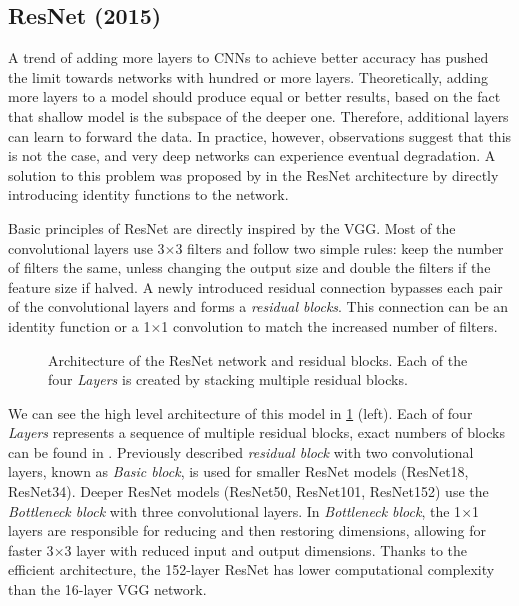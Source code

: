 \subsection{ResNet (2015)}
\label{sec:resnet}
A trend of adding more layers to CNNs to achieve better accuracy has pushed the limit towards networks with hundred or more layers.  Theoretically, adding more layers to a model should produce equal or better results, based on the fact that shallow model is the subspace of the deeper one. Therefore, additional layers can learn to forward the data. In practice, however, observations suggest that this is not the case, and very deep networks can experience eventual degradation. A solution to this problem was proposed by \citeauthor{bib:resnet} \cite{bib:resnet} in the ResNet architecture by directly introducing identity functions to the network.

Basic principles of ResNet are directly inspired by the VGG. Most of the convolutional layers use 3$\times$3 filters and follow two simple rules: keep the number of filters the same, unless changing the output size and double the filters if the feature size if halved. A newly introduced residual connection bypasses each pair of the convolutional layers and forms a \textit{residual blocks}. This connection can be an identity function or a 1$\times$1 convolution to match the increased number of filters.

\begin{figure}
    \resnetArch
    \caption[ResNet architecture]%
    {Architecture of the ResNet network and residual blocks. Each of the four \textit{Layers} is created by stacking multiple residual blocks.}
    \label{fig:resnet_arch}
\end{figure}

We can see the high level architecture of this model in \cref{fig:resnet_arch} (left). Each of four \textit{Layers} represents a sequence of multiple residual blocks, exact numbers of blocks can be found in \cite[table 1]{bib:resnet}. Previously described \textit{residual block} with two convolutional layers, known as \textit{Basic block}, is used for smaller ResNet models (ResNet18, ResNet34). Deeper ResNet models (ResNet50, ResNet101, ResNet152) use the \textit{Bottleneck block} with three convolutional layers. In \textit{Bottleneck block}, the 1$\times$1 layers are responsible for reducing and then restoring dimensions, allowing for faster 3$\times$3 layer with reduced input and output dimensions. Thanks to the efficient architecture, the 152-layer ResNet has lower computational complexity than the 16-layer VGG network.



